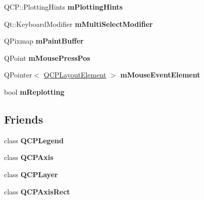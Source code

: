 \begin{DoxyCompactItemize}
\item 
Q\+C\+P\+::\+Plotting\+Hints {\bfseries m\+Plotting\+Hints}\hypertarget{class_q_custom_plot_aa184197a6101a9cc5807469e1d006c9e}{}\label{class_q_custom_plot_aa184197a6101a9cc5807469e1d006c9e}

\item 
Qt\+::\+Keyboard\+Modifier {\bfseries m\+Multi\+Select\+Modifier}\hypertarget{class_q_custom_plot_a0e97e701c5671e7e463d2ce0211d0f8a}{}\label{class_q_custom_plot_a0e97e701c5671e7e463d2ce0211d0f8a}

\item 
Q\+Pixmap {\bfseries m\+Paint\+Buffer}\hypertarget{class_q_custom_plot_a753630df96e0672098d9e88bd41d1913}{}\label{class_q_custom_plot_a753630df96e0672098d9e88bd41d1913}

\item 
Q\+Point {\bfseries m\+Mouse\+Press\+Pos}\hypertarget{class_q_custom_plot_ac57090da95056ae4dd67be67adfa85bd}{}\label{class_q_custom_plot_ac57090da95056ae4dd67be67adfa85bd}

\item 
Q\+Pointer$<$ \hyperlink{class_q_c_p_layout_element}{Q\+C\+P\+Layout\+Element} $>$ {\bfseries m\+Mouse\+Event\+Element}\hypertarget{class_q_custom_plot_a2f2e8b25e59cf3cf7b15e4767c02e747}{}\label{class_q_custom_plot_a2f2e8b25e59cf3cf7b15e4767c02e747}

\item 
bool {\bfseries m\+Replotting}\hypertarget{class_q_custom_plot_ab30daeca6612c3948afd368dce5f1c39}{}\label{class_q_custom_plot_ab30daeca6612c3948afd368dce5f1c39}

\end{DoxyCompactItemize}
\subsection*{Friends}
\begin{DoxyCompactItemize}
\item 
class {\bfseries Q\+C\+P\+Legend}\hypertarget{class_q_custom_plot_a8429035e7adfbd7f05805a6530ad5e3b}{}\label{class_q_custom_plot_a8429035e7adfbd7f05805a6530ad5e3b}

\item 
class {\bfseries Q\+C\+P\+Axis}\hypertarget{class_q_custom_plot_af123edeca169ec7a31958a1d714e1a8a}{}\label{class_q_custom_plot_af123edeca169ec7a31958a1d714e1a8a}

\item 
class {\bfseries Q\+C\+P\+Layer}\hypertarget{class_q_custom_plot_a5dbf96bf7664c1b6fce49063eeea6eef}{}\label{class_q_custom_plot_a5dbf96bf7664c1b6fce49063eeea6eef}

\item 
class {\bfseries Q\+C\+P\+Axis\+Rect}\hypertarget{class_q_custom_plot_acbf20ecb140f66c5fd1bc64ae0762990}{}\label{class_q_custom_plot_acbf20ecb140f66c5fd1bc64ae0762990}

\end{DoxyCompactItemize}


